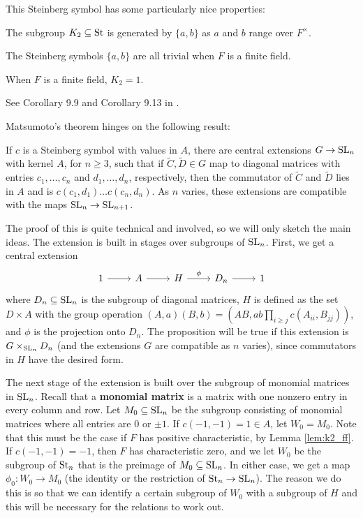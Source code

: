This Steinberg symbol has some particularly nice properties:
\begin{lemma}
    The subgroup $K_2 \subseteq \mathrm{St}$ is generated by $\{ a, b \}$ as $a$ and $b$ range over $F^\times$.
\end{lemma}
\begin{lemma}
    \label{lem:k2_ff}
    The Steinberg symbols $\{ a, b \}$ are all trivial when $F$ is a finite field.
\end{lemma}
\begin{corollary}
    When $F$ is a finite field, $K_2 = 1$.
\end{corollary}
See Corollary 9.9 and Corollary 9.13 in \cite{MilnorK}.

Matsumoto's theorem hinges on the following result:
\begin{proposition}
    \label{prop:matsumoto_ext}
    If $c$ is a Steinberg symbol with values in $A$, there are central extensions $G \to \mathrm{SL}_n$ with kernel $A$, for $n \geq 3$, such that if $\tilde{C}, \tilde{D} \in G$ map to diagonal matrices with entries $c_1, \ldots, c_n$ and $d_1, \ldots, d_n$, respectively, then the commutator of $\tilde{C}$ and $\tilde{D}$ lies in $A$ and is $c(c_1, d_1) \ldots c(c_n, d_n)$. As $n$ varies, these extensions are compatible with the maps $\mathrm{SL}_n \to \mathrm{SL}_{n + 1}$.
\end{proposition}
The proof of this is quite technical and involved, so we will only sketch the main ideas. The extension is built in stages over subgroups of $\mathrm{SL}_n$. First, we get a central extension
\[
\begin{tikzcd}
    \arrow[from=1-1, to=1-2]
    \arrow[from=1-2, to=1-3]
    \arrow["{\phi}", from=1-3, to=1-4]
    \arrow[from=1-4, to=1-5]
    1 & A & H & D_n & 1
\end{tikzcd}
\]
where $D_n \subseteq \mathrm{SL}_n$ is the subgroup of diagonal matrices, $H$ is defined as the set $D \times A$ with the group operation $(A, a)(B, b) = \left( AB, ab \prod_{i \geq j} c(A_{ii}, B_{jj}) \right)$, and $\phi$ is the projection onto $D_n$. The proposition will be true if this extension is $G \times_{\mathrm{SL}_n} D_n$ (and the extensions $G$ are compatible as $n$ varies), since commutators in $H$ have the desired form.

The next stage of the extension is built over the subgroup of monomial matrices in $\mathrm{SL}_n$. Recall that a \textbf{monomial matrix} is a matrix with one nonzero entry in every column and row. Let $M_0 \subseteq \mathrm{SL}_n$ be the subgroup consisting of monomial matrices where all entries are $0$ or $\pm 1$. If $c(-1, -1) = 1 \in A$, let $W_0 = M_0$. Note that this must be the case if $F$ has positive characteristic, by Lemma \ref{lem:k2_ff}. If $c(-1, -1) = -1$, then $F$ has characteristic zero, and we let $W_0$ be the subgroup of $\mathrm{St}_n$ that is the preimage of $M_0 \subseteq \mathrm{SL}_n$. In either case, we get a map $\phi_0 : W_0 \to M_0$ (the identity or the restriction of $\mathrm{St}_n \to \mathrm{SL}_n$). The reason we do this is so that we can identify a certain subgroup of $W_0$ with a subgroup of $H$ and this will be necessary for the relations to work out.

